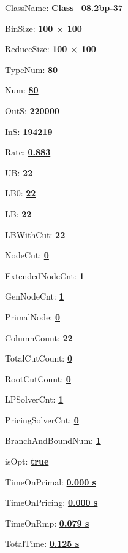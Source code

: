 \documentclass[11pt]{article}
\begin{document}
\pagestyle{empty}


ClassName: \underline{\textbf{Class_08.2bp-37}}
\par
BinSize: \underline{\textbf{100 × 100}}
\par
ReduceSize: \underline{\textbf{100 × 100}}
\par
TypeNum: \underline{\textbf{80}}
\par
Num: \underline{\textbf{80}}
\par
OutS: \underline{\textbf{220000}}
\par
InS: \underline{\textbf{194219}}
\par
Rate: \underline{\textbf{0.883}}
\par
UB: \underline{\textbf{22}}
\par
LB0: \underline{\textbf{22}}
\par
LB: \underline{\textbf{22}}
\par
LBWithCut: \underline{\textbf{22}}
\par
NodeCut: \underline{\textbf{0}}
\par
ExtendedNodeCnt: \underline{\textbf{1}}
\par
GenNodeCnt: \underline{\textbf{1}}
\par
PrimalNode: \underline{\textbf{0}}
\par
ColumnCount: \underline{\textbf{22}}
\par
TotalCutCount: \underline{\textbf{0}}
\par
RootCutCount: \underline{\textbf{0}}
\par
LPSolverCnt: \underline{\textbf{1}}
\par
PricingSolverCnt: \underline{\textbf{0}}
\par
BranchAndBoundNum: \underline{\textbf{1}}
\par
isOpt: \underline{\textbf{true}}
\par
TimeOnPrimal: \underline{\textbf{0.000 s}}
\par
TimeOnPricing: \underline{\textbf{0.000 s}}
\par
TimeOnRmp: \underline{\textbf{0.079 s}}
\par
TotalTime: \underline{\textbf{0.125 s}}
\par
\newpage


\end{document}
